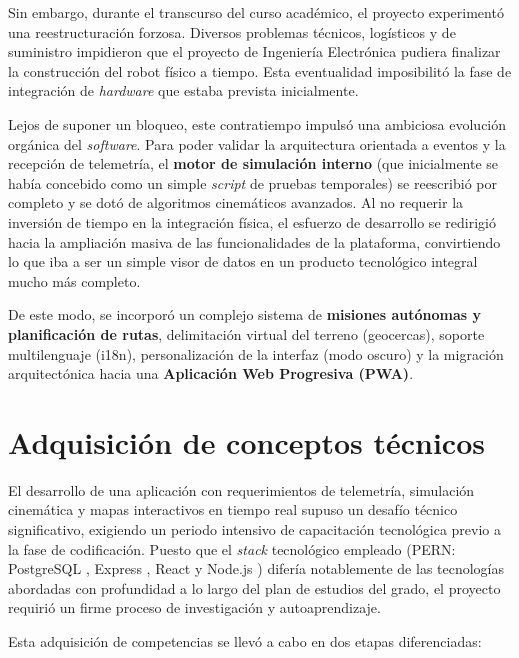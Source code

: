 Sin embargo, durante el transcurso del curso académico, el proyecto experimentó una reestructuración forzosa. Diversos problemas técnicos, logísticos y de suministro impidieron que el proyecto de Ingeniería Electrónica pudiera finalizar la construcción del robot físico a tiempo. Esta eventualidad imposibilitó la fase de integración de \textit{hardware} que estaba prevista inicialmente.

Lejos de suponer un bloqueo, este contratiempo impulsó una ambiciosa evolución orgánica del \textit{software}. Para poder validar la arquitectura orientada a eventos y la recepción de telemetría, el \textbf{motor de simulación interno} (que inicialmente se había concebido como un simple \textit{script} de pruebas temporales) se reescribió por completo y se dotó de algoritmos cinemáticos avanzados. Al no requerir la inversión de tiempo en la integración física, el esfuerzo de desarrollo se redirigió hacia la ampliación masiva de las funcionalidades de la plataforma, convirtiendo lo que iba a ser un simple visor de datos en un producto tecnológico integral mucho más completo.

De este modo, se incorporó un complejo sistema de \textbf{misiones autónomas y planificación de rutas}, delimitación virtual del terreno (geocercas), soporte multilenguaje (i18n), personalización de la interfaz (modo oscuro) y la migración arquitectónica hacia una \textbf{Aplicación Web Progresiva (PWA)}.

\section{Adquisición de conceptos técnicos}

El desarrollo de una aplicación con requerimientos de telemetría, simulación cinemática y mapas interactivos en tiempo real supuso un desafío técnico significativo, exigiendo un periodo intensivo de capacitación tecnológica previo a la fase de codificación. Puesto que el \textit{stack} tecnológico empleado (PERN: PostgreSQL \cite{postgresql}, Express \cite{express}, React \cite{react} y Node.js \cite{nodejs}) difería notablemente de las tecnologías abordadas con profundidad a lo largo del plan de estudios del grado, el proyecto requirió un firme proceso de investigación y autoaprendizaje.

Esta adquisición de competencias se llevó a cabo en dos etapas diferenciadas:

